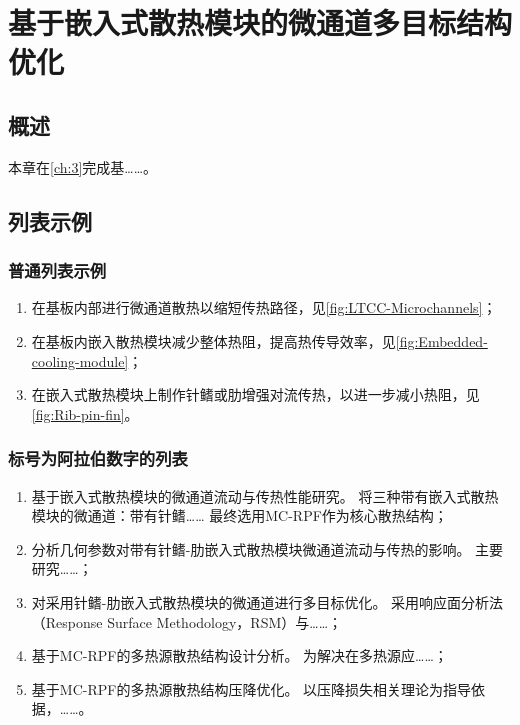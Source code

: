 
\chapter{基于嵌入式散热模块的微通道多目标结构优化}\label{ch:4}

\section{概述}
本章在\cref{ch:3}完成基……。

\section{列表示例}\label{sec:enumerate}

\subsection{普通列表示例}
\begin{enumerate}
    \item 在基板内部进行微通道散热以缩短传热路径，见\cref{fig:LTCC-Microchannels}；
    \item 在基板内嵌入散热模块减少整体热阻，提高热传导效率，见\cref{fig:Embedded-cooling-module}；
    \item 在嵌入式散热模块上制作针鳍或肋增强对流传热，以进一步减小热阻，见\cref{fig:Rib-pin-fin}。
\end{enumerate}

\subsection{标号为阿拉伯数字的列表}

\begin{enumerate}[label =(\arabic*)]

    \item 基于嵌入式散热模块的微通道流动与传热性能研究。
          将三种带有嵌入式散热模块的微通道：带有针鳍……
          最终选用MC-RPF作为核心散热结构；
    \item 分析几何参数对带有针鳍-肋嵌入式散热模块微通道流动与传热的影响。
          主要研究……；
    \item 对采用针鳍-肋嵌入式散热模块的微通道进行多目标优化。
          采用响应面分析法（Response Surface Methodology，RSM）与……；
    \item 基于MC-RPF的多热源散热结构设计分析。
          为解决在多热源应……；
    \item 基于MC-RPF的多热源散热结构压降优化。
          以压降损失相关理论为指导依据，……。

\end{enumerate}

